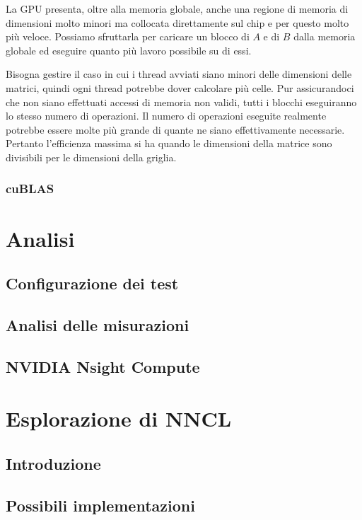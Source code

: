 \documentclass[a4paper]{article}
\begin{document}
La GPU presenta, oltre alla memoria globale, anche una regione di memoria di dimensioni molto minori ma collocata direttamente sul chip e per questo molto più veloce. Possiamo sfruttarla per caricare un blocco di $A$ e di $B$ dalla memoria globale ed eseguire quanto più lavoro possibile su di essi.

Bisogna gestire il caso in cui i thread avviati siano minori delle dimensioni delle matrici, quindi ogni thread potrebbe dover calcolare più celle.
Pur assicurandoci che non siano effettuati accessi di memoria non validi, tutti i blocchi eseguiranno lo stesso numero di operazioni. Il numero di operazioni eseguite realmente potrebbe essere molte più grande di quante ne siano effettivamente necessarie. Pertanto l'efficienza massima si ha quando le dimensioni della matrice sono divisibili per le dimensioni della griglia.

\subsubsection{cuBLAS}

\section{Analisi}

\subsection{Configurazione dei test}

\subsection{Analisi delle misurazioni}

\subsection{NVIDIA Nsight Compute}

\section{Esplorazione di NNCL}

\subsection{Introduzione}

\subsection{Possibili implementazioni}

\printbibliography
\end{document}
